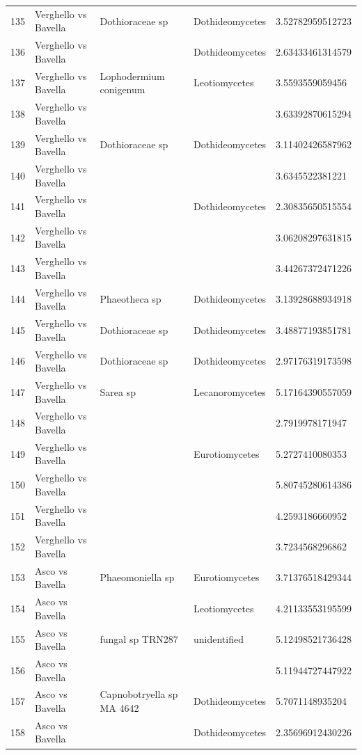 \documentclass[12pt]{article}\usepackage[]{graphicx}\usepackage[]{color}
\numberwithin{figure}{section}
\begin{document}
\begin{table}[ht]
\begin{tabular}{lllll}
  135 & Verghello vs Bavella & Dothioraceae sp & Dothideomycetes & 3.52782959512723 \\ 
  136 & Verghello vs Bavella &  & Dothideomycetes & 2.63433461314579 \\ 
  137 & Verghello vs Bavella & Lophodermium conigenum & Leotiomycetes & 3.5593559059456 \\ 
  138 & Verghello vs Bavella &  &  & 3.63392870615294 \\ 
  139 & Verghello vs Bavella & Dothioraceae sp & Dothideomycetes & 3.11402426587962 \\ 
  140 & Verghello vs Bavella &  &  & 3.6345522381221 \\ 
  141 & Verghello vs Bavella &  & Dothideomycetes & 2.30835650515554 \\ 
  142 & Verghello vs Bavella &  &  & 3.06208297631815 \\ 
  143 & Verghello vs Bavella &  &  & 3.44267372471226 \\ 
  144 & Verghello vs Bavella & Phaeotheca sp & Dothideomycetes & 3.13928688934918 \\ 
  145 & Verghello vs Bavella & Dothioraceae sp & Dothideomycetes & 3.48877193851781 \\ 
  146 & Verghello vs Bavella & Dothioraceae sp & Dothideomycetes & 2.97176319173598 \\ 
  147 & Verghello vs Bavella & Sarea sp & Lecanoromycetes & 5.17164390557059 \\ 
  148 & Verghello vs Bavella &  &  & 2.7919978171947 \\ 
  149 & Verghello vs Bavella &  & Eurotiomycetes & 5.2727410080353 \\ 
  150 & Verghello vs Bavella &  &  & 5.80745280614386 \\ 
  151 & Verghello vs Bavella &  &  & 4.2593186660952 \\ 
  152 & Verghello vs Bavella &  &  & 3.7234568296862 \\ 
  153 & Asco vs Bavella & Phaeomoniella sp & Eurotiomycetes & 3.71376518429344 \\ 
  154 & Asco vs Bavella &  & Leotiomycetes & 4.21133553195599 \\ 
  155 & Asco vs Bavella & fungal sp TRN287 & unidentified & 5.12498521736428 \\ 
  156 & Asco vs Bavella &  &  & 5.11944727447922 \\ 
  157 & Asco vs Bavella & Capnobotryella sp MA 4642 & Dothideomycetes & 5.7071148935204 \\ 
  158 & Asco vs Bavella &  & Dothideomycetes & 2.35696912430226 \\ 

\end{tabular}
\end{table}
\end{document}
